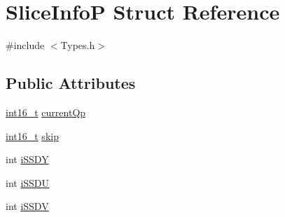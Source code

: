 \hypertarget{struct_slice_info_p}{
\section{SliceInfoP Struct Reference}
\label{struct_slice_info_p}
}


{\ttfamily \#include $<$Types.h$>$}

\subsection*{Public Attributes}
\begin{DoxyCompactItemize}
\item 
\hyperlink{_types_8h_ae615613535a2b2445773922f5d45a861}{int16\_\-t} \hyperlink{struct_slice_info_p_a74257bd8b090949d86ec7350bea2c51f}{currentQp}
\item 
\hyperlink{_types_8h_ae615613535a2b2445773922f5d45a861}{int16\_\-t} \hyperlink{struct_slice_info_p_a6b647c1903a7cb53b2b4584f62976b90}{skip}
\item 
int \hyperlink{struct_slice_info_p_a3a19f5c6611da92995cc2bc2a8383995}{iSSDY}
\item 
int \hyperlink{struct_slice_info_p_a3024a9e52aa66fdddf6055f79198c579}{iSSDU}
\item 
int \hyperlink{struct_slice_info_p_a5f3b5a8d778530e3b803b91129bd63df}{iSSDV}
\end{DoxyCompactItemize}


